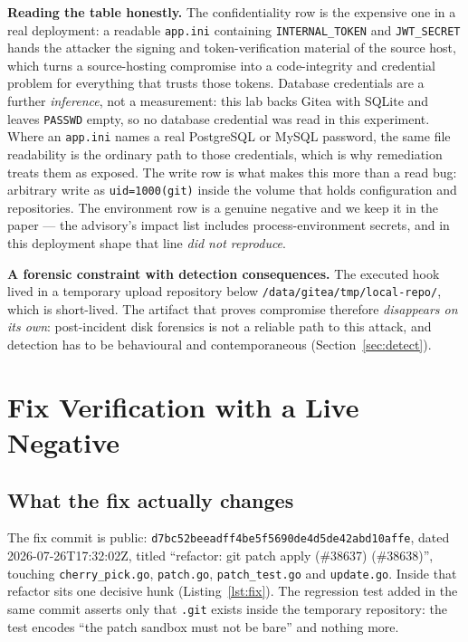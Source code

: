 \documentclass[journal]{IEEEtran}
\begin{document}
\textbf{Reading the table honestly.} The confidentiality row is the expensive
one in a real deployment: a readable \texttt{app.ini} containing
\texttt{INTERNAL\_TOKEN} and \texttt{JWT\_SECRET} hands the attacker the signing and
token-verification material of the source host, which turns a source-hosting
compromise into a code-integrity and credential problem for everything that trusts
those tokens. Database credentials are a further \emph{inference}, not a measurement:
this lab backs Gitea with SQLite and leaves \texttt{PASSWD} empty, so no database
credential was read in this experiment. Where an \texttt{app.ini} names a real
PostgreSQL or MySQL password, the same file readability is the ordinary path to those
credentials, which is why remediation treats them as exposed. The write row is
what makes this more than a read bug: arbitrary write as \texttt{uid=1000(git)}
inside the volume that holds configuration and repositories. The environment row
is a genuine negative and we keep it in the paper --- the advisory's impact list
includes process-environment secrets, and in this deployment shape that line
\emph{did not reproduce}.

\textbf{A forensic constraint with detection consequences.} The executed hook
lived in a temporary upload repository below
\texttt{/data/gitea/tmp/local-repo/}, which is short-lived. The artifact that
proves compromise therefore \emph{disappears on its own}: post-incident disk
forensics is not a reliable path to this attack, and detection has to be
behavioural and contemporaneous (Section~\ref{sec:detect}).
\section{Fix Verification with a Live Negative}
\label{sec:fix}

\subsection{What the fix actually changes}
\label{sec:fixchange}

The fix commit is public: \texttt{d7bc52be\allowbreak eadff4be5f5690de4d5de42a\allowbreak bd10affe},
dated 2026-07-26T17:32:02Z, titled ``refactor: git patch apply (\#38637)
(\#38638)'', touching \texttt{cherry\_pick.go}, \texttt{patch.go},
\texttt{patch\_test.go} and \texttt{update.go}. Inside that refactor sits one
decisive hunk (Listing~\ref{lst:fix}). The regression test added in the same
commit asserts only that \texttt{.git} exists inside the temporary repository:
the test encodes ``the patch sandbox must not be bare'' and nothing more.
\end{document}
